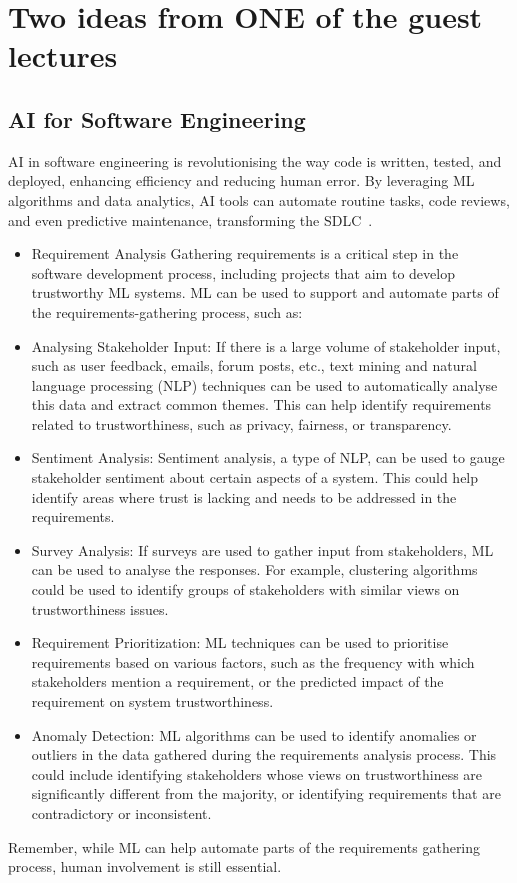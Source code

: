 \documentclass[a4paper,11pt]{article}
\begin{document}
\section{Two ideas from ONE of the guest lectures}
\subsection{AI for Software Engineering}

AI in software engineering is revolutionising the way code is written, tested, and deployed, enhancing efficiency and reducing human error. By leveraging ML algorithms and data analytics, AI tools can automate routine tasks, code reviews, and even predictive maintenance, transforming the SDLC~\cite{barenkamp2020applications, feldt2018ways}.

\begin{itemize}
\item Requirement Analysis
Gathering requirements is a critical step in the software development process, including projects that aim to develop trustworthy ML systems. ML can be used to support and automate parts of the requirements-gathering process, such as:

\item Analysing Stakeholder Input: If there is a large volume of stakeholder input, such as user feedback, emails, forum posts, etc., text mining and natural language processing (NLP) techniques can be used to automatically analyse this data and extract common themes. This can help identify requirements related to trustworthiness, such as privacy, fairness, or transparency.

\item Sentiment Analysis: Sentiment analysis, a type of NLP, can be used to gauge stakeholder sentiment about certain aspects of a system. This could help identify areas where trust is lacking and needs to be addressed in the requirements.

\item Survey Analysis: If surveys are used to gather input from stakeholders, ML can be used to analyse the responses. For example, clustering algorithms could be used to identify groups of stakeholders with similar views on trustworthiness issues.

\item Requirement Prioritization: ML techniques can be used to prioritise requirements based on various factors, such as the frequency with which stakeholders mention a requirement, or the predicted impact of the requirement on system trustworthiness.

\item Anomaly Detection: ML algorithms can be used to identify anomalies or outliers in the data gathered during the requirements analysis process. This could include identifying stakeholders whose views on trustworthiness are significantly different from the majority, or identifying requirements that are contradictory or inconsistent.
\end{itemize}
Remember, while ML can help automate parts of the requirements gathering process, human involvement is still essential. 
\end{document}
